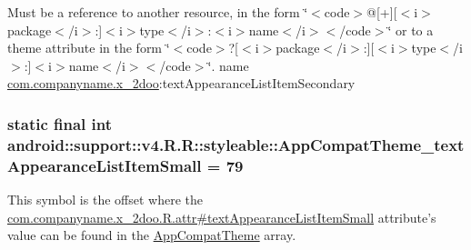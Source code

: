 Must be a reference to another resource, in the form \char`\"{}$<$code$>$@\mbox{[}+\mbox{]}\mbox{[}$<$i$>$package$<$/i$>$:\mbox{]}$<$i$>$type$<$/i$>$:$<$i$>$name$<$/i$>$$<$/code$>$\char`\"{} or to a theme attribute in the form \char`\"{}$<$code$>$?\mbox{[}$<$i$>$package$<$/i$>$:\mbox{]}\mbox{[}$<$i$>$type$<$/i$>$:\mbox{]}$<$i$>$name$<$/i$>$$<$/code$>$\char`\"{}.  name \hyperlink{namespacecom_1_1companyname_1_1x__2doo}{com.companyname.x\_\-2doo}:textAppearanceListItemSecondary \hypertarget{classandroid_1_1support_1_1v4_1_1_r_1_1styleable_e4cba9e6e74a50e8866c825124a656b8}{
\subsubsection[{AppCompatTheme\_\-textAppearanceListItemSmall}]{\setlength{\rightskip}{0pt plus 5cm}static final int android::support::v4.R.R::styleable::AppCompatTheme\_\-textAppearanceListItemSmall = 79}}
\label{classandroid_1_1support_1_1v4_1_1_r_1_1styleable_e4cba9e6e74a50e8866c825124a656b8}


This symbol is the offset where the \hyperlink{classcom_1_1companyname_1_1x__2doo_1_1_r_1_1attr_cf18b0d5b86e48b378387a4a26f282e4}{com.companyname.x\_\-2doo.R.attr\#textAppearanceListItemSmall} attribute's value can be found in the \hyperlink{classandroid_1_1support_1_1v4_1_1_r_1_1styleable_0873e92ba21076bb5a4aeadeb7f5779f}{AppCompatTheme} array.

